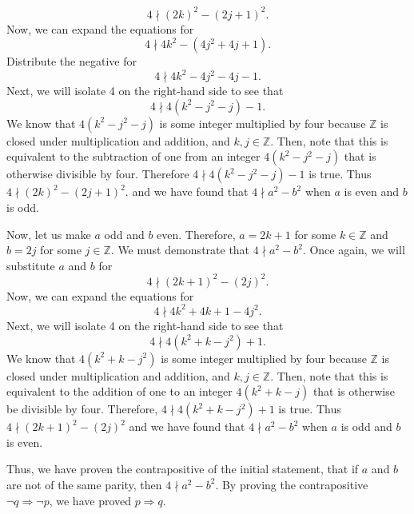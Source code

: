 \documentclass[12pt]{exam}
\begin{document}
\begin{questions}
\begin{equation*}
4 \nmid (2k)^2-(2j +1)^2.
\end{equation*}
Now, we can expand the equations for
\begin{equation*}
4 \nmid 4k^2-(4j^2+4j+1).
\end{equation*}
Distribute the negative for
\begin{equation*}
4 \nmid 4k^2-4j^2-4j-1.
\end{equation*}
Next, we will isolate 4 on the right-hand side to see that
\begin{equation*}
4 \nmid 4(k^2-j^2-j)-1.
\end{equation*}
We know that $4(k^2-j^2-j)$ is some integer multiplied by four because $\mathbb{Z}$ is closed under multiplication and addition, and $k,j \in\mathbb{Z}$. Then, note that this is equivalent to the subtraction of one from an integer $4(k^2-j^2-j)$ that is otherwise divisible by four. Therefore $4 \nmid 4(k^2-j^2-j)-1$ is true. Thus $4 \nmid (2k)^2-(2j +1)^2.$ and we have found that $4 \nmid a^2-b^2$ when $a$ is even and $b$ is odd. 
\par
Now, let us make $a$ odd and $b$ even. Therefore, $a = 2k+1$ for some $k \in \mathbb{Z}$ and $b = 2j$ for some $j \in \mathbb{Z}$. We must demonstrate that $4 \nmid a^2-b^2$. Once again, we will substitute $a$ and $b$ for
\begin{equation*}
4 \nmid (2k+1)^2-(2j)^2.
\end{equation*}
Now, we can expand the equations for
\begin{equation*}
4 \nmid 4k^2+4k+1-4j^2.
\end{equation*}
Next, we will isolate 4 on the right-hand side to see that
\begin{equation*}
4 \nmid 4(k^2+k-j^2)+1.
\end{equation*}
We know that $4(k^2+k-j^2)$ is some integer multiplied by four because $\mathbb{Z}$ is closed under multiplication and addition, and $k,j \in\mathbb{Z}$. Then, note that this is equivalent to the addition of one to an integer $4(k^2+k-j)$ that is otherwise be divisible by four. Therefore, $4 \nmid 4(k^2+k-j^2)+1$ is true. Thus $4 \nmid (2k+1)^2-(2j)^2$ and we have found that $4 \nmid a^2-b^2$ when $a$ is odd and $b$ is even.
\par
Thus, we have proven the contrapositive of the initial statement, that if $a$ and $b$ are not of the same parity, then $4 \nmid a^2-b^2$. By proving the contrapositive $\neg q \Rightarrow \neg p$, we have proved $p \Rightarrow q$.
\par

\end{questions}
\end{document}

